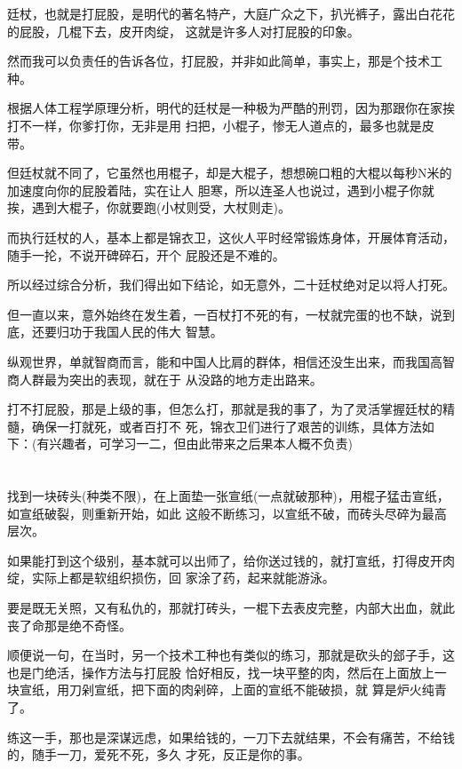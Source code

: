 \documentclass[11pt,a4paper,onecolumn]{article}
\begin{document}
廷杖，也就是打屁股，是明代的著名特产，大庭广众之下，扒光裤子，露出白花花的屁股，几棍下去，皮开肉绽，
这就是许多人对打屁股的印象。

然而我可以负责任的告诉各位，打屁股，并非如此简单，事实上，那是个技术工种。

根据人体工程学原理分析，明代的廷杖是一种极为严酷的刑罚，因为那跟你在家挨打不一样，你爹打你，无非是用
扫把，小棍子，惨无人道点的，最多也就是皮带。

但廷杖就不同了，它虽然也用棍子，却是大棍子，想想碗口粗的大棍以每秒N米的加速度向你的屁股着陆，实在让人
胆寒，所以连圣人也说过，遇到小棍子你就挨，遇到大棍子，你就要跑(小杖则受，大杖则走)。

而执行廷杖的人，基本上都是锦衣卫，这伙人平时经常锻炼身体，开展体育活动，随手一抡，不说开碑碎石，开个
屁股还是不难的。

所以经过综合分析，我们得出如下结论，如无意外，二十廷杖绝对足以将人打死。

但一直以来，意外始终在发生着，一百杖打不死的有，一杖就完蛋的也不缺，说到底，还要归功于我国人民的伟大
智慧。

纵观世界，单就智商而言，能和中国人比肩的群体，相信还没生出来，而我国高智商人群最为突出的表现，就在于
从没路的地方走出路来。

打不打屁股，那是上级的事，但怎么打，那就是我的事了，为了灵活掌握廷杖的精髓，确保一打就死，或者百打不
死，锦衣卫们进行了艰苦的训练，具体方法如下：(有兴趣者，可学习一二，但由此带来之后果本人概不负责)

\section[\thesection]{}

找到一块砖头(种类不限)，在上面垫一张宣纸(一点就破那种)，用棍子猛击宣纸，如宣纸破裂，则重新开始，如此
这般不断练习，以宣纸不破，而砖头尽碎为最高层次。

如果能打到这个级别，基本就可以出师了，给你送过钱的，就打宣纸，打得皮开肉绽，实际上都是软组织损伤，回
家涂了药，起来就能游泳。

要是既无关照，又有私仇的，那就打砖头，一棍下去表皮完整，内部大出血，就此丧了命那是绝不奇怪。

顺便说一句，在当时，另一个技术工种也有类似的练习，那就是砍头的郐子手，这也是门绝活，操作方法与打屁股
恰好相反，找一块平整的肉，然后在上面放上一块宣纸，用刀剁宣纸，把下面的肉剁碎，上面的宣纸不能破损，就
算是炉火纯青了。

练这一手，那也是深谋远虑，如果给钱的，一刀下去就结果，不会有痛苦，不给钱的，随手一刀，爱死不死，多久
才死，反正是你的事。
\end{document}
